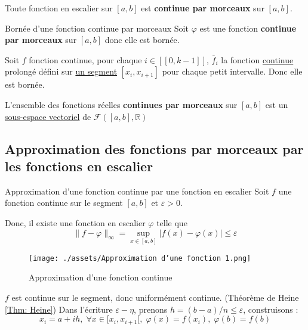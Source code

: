 Toute fonction en escalier sur $[a,b]$ est \textbf{continue par morceaux} sur $[a,b]$.

\begin{Prop}{Bornée d'une fonction continue par morceaux}{}
  Soit $\varphi$ est une fonction \textbf{continue par morceaux} sur $[a,b]$ donc elle est bornée.
\end{Prop}

\begin{myproof}{}{}
  Soit $f$ fonction continue, pour chaque $i \in [\![0, k-1]\!]$, $\bar{f}_i$ la fonction \underline{continue} prolongé défini sur \underline{un segment} $[x_i, x _{i+1}]$ pour chaque petit intervalle. Donc elle est bornée.
\end{myproof}

\begin{Prop}{}{}
  L'ensemble des fonctions réelles \textbf{continues par morceaux} sur $[a,b]$ est un \underline{sous-espace vectoriel} de $\mathcal{F}([a,b], \mathbb{R})$
\end{Prop}

\subsection{Approximation des fonctions par morceaux par les fonctions en escalier} %
\label{sub:Approximation des fonctions par morceaux par les fonctions en escalier}

\begin{Theorem}{Approximation d'une fonction continue par une fonction en escalier}{}
  Soit $f$ une fonction continue sur le segment $[a,b]$ et $\varepsilon>0$. 

  Donc, il existe une fonction en escalier $\varphi$ telle que 
  \[
    \| f- \varphi \| _{\infty}  = \sup _{x \in [a,b]} |f(x) - \varphi(x)|\le \varepsilon
  \]

  \begin{figure}[H] %
    \centering
    \texttt{[image: ./assets/Approximation d'une fonction 1.png]}
    \caption{Approximation d'une fonction continue}
  \end{figure}

  
\end{Theorem}

\begin{myproof}{}{}
  $f$ est continue sur le segment, donc uniformément continue. (Théorème de Heine \ref{Thm: Heine}) Dans l'écriture $\varepsilon - \eta$, prenons $h = (b-a)/n \le \varepsilon$, construisons :
  \begin{equation}
    x_i = a + ih,\; \forall x \in [x_i,x _{i+1}[ , \; \varphi(x) = f(x_i),\; \varphi(b) = f(b)
  \end{equation}
\end{myproof}


